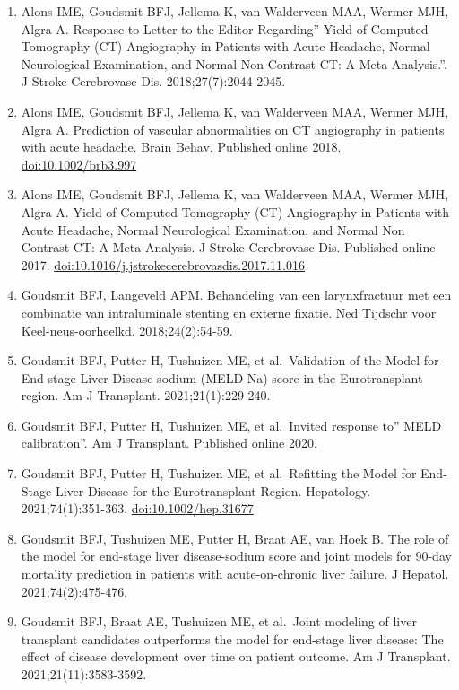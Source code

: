 \documentclass[11pt,english,]{book} %
\begin{document}
\begin{enumerate}
\def\labelenumi{\arabic{enumi}.}
\item
  Alons IME, Goudsmit BFJ, Jellema K, van Walderveen MAA, Wermer MJH, Algra A. Response to Letter to the Editor Regarding'' Yield of Computed Tomography (CT) Angiography in Patients with Acute Headache, Normal Neurological Examination, and Normal Non Contrast CT: A Meta-Analysis.''. J Stroke Cerebrovasc Dis. 2018;27(7):2044-2045.
\item
  Alons IME, Goudsmit BFJ, Jellema K, van Walderveen MAA, Wermer MJH, Algra A. Prediction of vascular abnormalities on CT angiography in patients with acute headache. Brain Behav. Published online 2018. \url{doi:10.1002/brb3.997}
\item
  Alons IME, Goudsmit BFJ, Jellema K, van Walderveen MAA, Wermer MJH, Algra A. Yield of Computed Tomography (CT) Angiography in Patients with Acute Headache, Normal Neurological Examination, and Normal Non Contrast CT: A Meta-Analysis. J Stroke Cerebrovasc Dis. Published online 2017. \url{doi:10.1016/j.jstrokecerebrovasdis.2017.11.016}
\item
  Goudsmit BFJ, Langeveld APM. Behandeling van een larynxfractuur met een combinatie van intraluminale stenting en externe fixatie. Ned Tijdschr voor Keel-neus-oorheelkd. 2018;24(2):54-59.
\item
  Goudsmit BFJ, Putter H, Tushuizen ME, et al.~Validation of the Model for End-stage Liver Disease sodium (MELD-Na) score in the Eurotransplant region. Am J Transplant. 2021;21(1):229-240.
\item
  Goudsmit BFJ, Putter H, Tushuizen ME, et al.~Invited response to'' MELD calibration''. Am J Transplant. Published online 2020.
\item
  Goudsmit BFJ, Putter H, Tushuizen ME, et al.~Refitting the Model for End-Stage Liver Disease for the Eurotransplant Region. Hepatology. 2021;74(1):351-363. \url{doi:10.1002/hep.31677}
\item
  Goudsmit BFJ, Tushuizen ME, Putter H, Braat AE, van Hoek B. The role of the model for end-stage liver disease-sodium score and joint models for 90-day mortality prediction in patients with acute-on-chronic liver failure. J Hepatol. 2021;74(2):475-476.
\item
  Goudsmit BFJ, Braat AE, Tushuizen ME, et al.~Joint modeling of liver transplant candidates outperforms the model for end-stage liver disease: The effect of disease development over time on patient outcome. Am J Transplant. 2021;21(11):3583-3592.

\end{enumerate}
\end{document}
